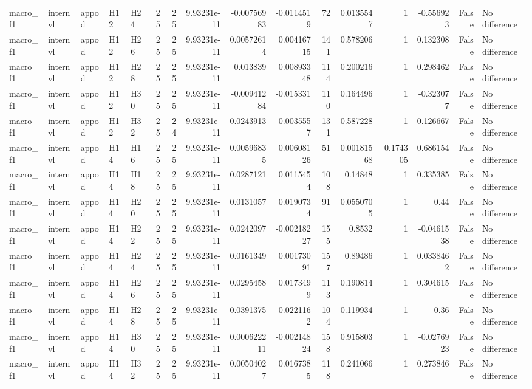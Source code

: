 \begin{longtable}{lllllrrrrrrrrrrl}
macro\_f1 & internvl & appod & H12 & H24 & 25 & 25 & 9.93231e-11 & -0.00756983 & -0.0114519 & 72 & 0.0135547 & 1 & -0.556923 & False & No difference \\
macro\_f1 & internvl & appod & H12 & H26 & 25 & 25 & 9.93231e-11 & 0.00572614 & 0.00416715 & 141 & 0.578206 & 1 & 0.132308 & False & No difference \\
macro\_f1 & internvl & appod & H12 & H28 & 25 & 25 & 9.93231e-11 & 0.013839 & 0.00893348 & 114 & 0.200216 & 1 & 0.298462 & False & No difference \\
macro\_f1 & internvl & appod & H12 & H30 & 25 & 25 & 9.93231e-11 & -0.00941284 & -0.015331 & 110 & 0.164496 & 1 & -0.323077 & False & No difference \\
macro\_f1 & internvl & appod & H12 & H32 & 25 & 24 & 9.93231e-11 & 0.0243913 & 0.0035557 & 131 & 0.587228 & 1 & 0.126667 & False & No difference \\
macro\_f1 & internvl & appod & H14 & H16 & 25 & 25 & 9.93231e-11 & 0.00596835 & 0.00608126 & 51 & 0.00181568 & 0.174305 & 0.686154 & False & No difference \\
macro\_f1 & internvl & appod & H14 & H18 & 25 & 25 & 9.93231e-11 & 0.0287121 & 0.0115454 & 108 & 0.14848 & 1 & 0.335385 & False & No difference \\
macro\_f1 & internvl & appod & H14 & H20 & 25 & 25 & 9.93231e-11 & 0.0131057 & 0.0190734 & 91 & 0.0550705 & 1 & 0.44 & False & No difference \\
macro\_f1 & internvl & appod & H14 & H22 & 25 & 25 & 9.93231e-11 & 0.0242097 & -0.00218227 & 155 & 0.8532 & 1 & -0.0461538 & False & No difference \\
macro\_f1 & internvl & appod & H14 & H24 & 25 & 25 & 9.93231e-11 & 0.0161349 & 0.00173091 & 157 & 0.89486 & 1 & 0.0338462 & False & No difference \\
macro\_f1 & internvl & appod & H14 & H26 & 25 & 25 & 9.93231e-11 & 0.0295458 & 0.0173499 & 113 & 0.190814 & 1 & 0.304615 & False & No difference \\
macro\_f1 & internvl & appod & H14 & H28 & 25 & 25 & 9.93231e-11 & 0.0391375 & 0.0221162 & 104 & 0.119934 & 1 & 0.36 & False & No difference \\
macro\_f1 & internvl & appod & H14 & H30 & 25 & 25 & 9.93231e-11 & 0.000622211 & -0.00214824 & 158 & 0.915803 & 1 & -0.0276923 & False & No difference \\
macro\_f1 & internvl & appod & H14 & H32 & 25 & 25 & 9.93231e-11 & 0.00504027 & 0.0167385 & 118 & 0.241066 & 1 & 0.273846 & False & No difference \\

\end{longtable}
